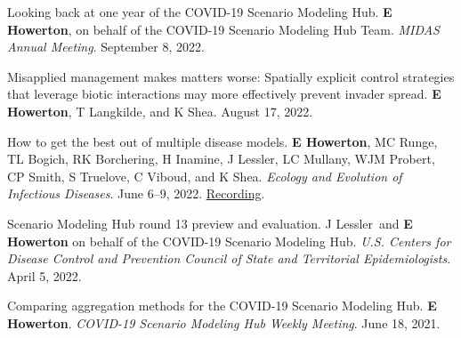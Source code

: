 \begin{cvnumbered}
  \item Looking back at one year of the COVID-19 Scenario Modeling Hub. \textbf{E Howerton\cvstar}, on behalf of the COVID-19 Scenario Modeling Hub Team. \textit{MIDAS Annual Meeting}. September 8, 2022.

  \item Misapplied management makes matters worse: Spatially explicit control strategies that leverage biotic interactions may more effectively prevent invader spread. \textbf{E Howerton\cvstar}, T Langkilde, and K Shea. August 17, 2022.

  \item How to get the best out of multiple disease models. \textbf{E Howerton\cvstar}, MC Runge, TL Bogich, RK Borchering, H Inamine, J Lessler, LC Mullany, WJM Probert, CP Smith, S Truelove, C Viboud, and K Shea. \textit{Ecology and Evolution of Infectious Diseases}. June 6--9, 2022. \href{https://www.youtube.com/watch?v=zLB9zyG-koI}{Recording}.

  \item Scenario Modeling Hub round 13 preview and evaluation. J Lessler\cvstar\ and \textbf{E Howerton\cvstar} on behalf of the COVID-19 Scenario Modeling Hub. \textit{U.S. Centers for Disease Control and Prevention Council of State and Territorial Epidemiologists}. April 5, 2022.

  \item Comparing aggregation methods for the COVID-19 Scenario Modeling Hub. \textbf{E Howerton\cvstar}. \textit{COVID-19 Scenario Modeling Hub Weekly Meeting}. June 18, 2021.
\end{cvnumbered}

